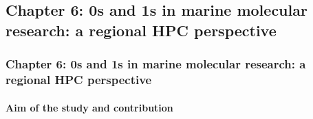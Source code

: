 \documentclass{beamer}
\begin{document}


   \begin{darkframes}
      \section{\textbf{Chapter 6:} 0s and 1s in marine molecular
      research: a regional HPC perspective}

      \begin{frame}
         \frametitle{\textbf{Chapter 6:} 0s and 1s in marine molecular research: a regional HPC perspective}
         \framesubtitle{Aim of the study and contribution}


         
      \end{frame}

   \end{darkframes}







   
      
         
\end{document}

